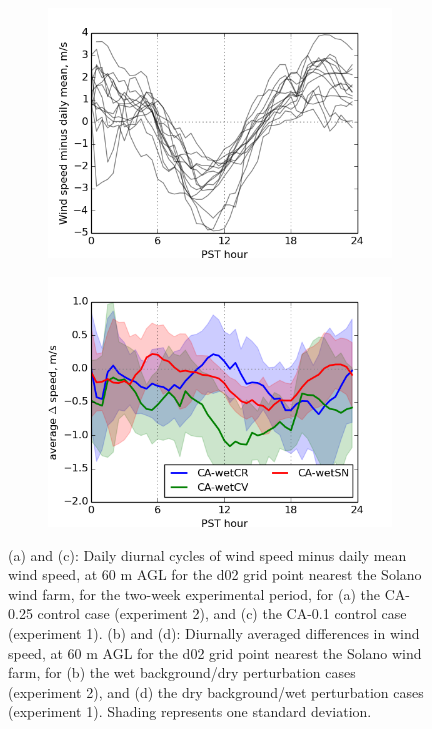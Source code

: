 \begin{figure}[here]
\begin{subfigure}{0.5\textwidth}
\includegraphics[width=1\textwidth]{ch3-wind/img/solano_controlwind_minusmean_CA0pt1_d02_level0.png}
\caption{}
\end{subfigure}
\begin{subfigure}{0.5\textwidth}
\includegraphics[width=1\textwidth]{ch3-wind/img/solano_diurnalwind_wet_regions_d02_level0.png}
\caption{}
\end{subfigure}
\caption{(a) and (c): Daily diurnal cycles of wind speed minus daily mean wind speed, at 60 m AGL for the d02 grid point nearest the Solano wind farm, for the two-week experimental period, for (a) the CA-0.25 control case (experiment 2), and (c) the CA-0.1 control case (experiment 1).  (b) and (d): Diurnally averaged differences in wind speed, at 60 m AGL for the d02 grid point nearest the Solano wind farm, for (b) the wet background/dry perturbation cases (experiment 2), and (d) the dry background/wet perturbation cases (experiment 1).  Shading represents one standard deviation.}
\label{fig:windSol_DiffDiurnalDryRg}
\end{figure}

